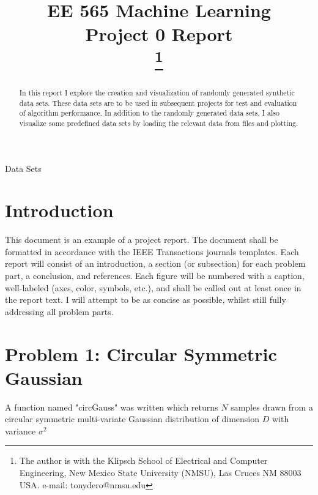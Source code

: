 \documentclass[conference]{IEEEtran}
\begin{document}
\title{EE 565 Machine Learning\\
Project 0 Report\\
\thanks{The author is with the Klipsch School of Electrical and Computer Engineering, New Mexico State University (NMSU), Las Cruces NM 88003 USA. e-mail: tonydero@nmsu.edu}
}

\author{}

\maketitle

\begin{abstract}

In this report I explore the creation and visualization of randomly generated synthetic data sets. These data sets are to be used in subsequent projects for test and evaluation of algorithm performance. In addition to the randomly generated data sets, I also visualize some predefined data sets by loading the relevant data from files and plotting.

\end{abstract}

\begin{IEEEkeywords}
	Data Sets
\end{IEEEkeywords}

\section{Introduction}

This document is an example of a project report. The document shall be formatted in accordance with the IEEE Transactions journals templates. Each report will consist of an introduction, a section (or subsection) for each problem part, a conclusion, and references. Each figure will be numbered with a caption, well-labeled (axes, color, symbols, etc.), and shall be called out at least once in the report text. I will attempt to be as concise as possible, whilst still fully addressing all problem parts.

\section{Problem 1: Circular Symmetric Gaussian}

A function named "circGauss" was written which returns $N$ samples drawn from a circular symmetric multi-variate Gaussian distribution of dimension $D$ with variance $\sigma^2$
\end{document}
